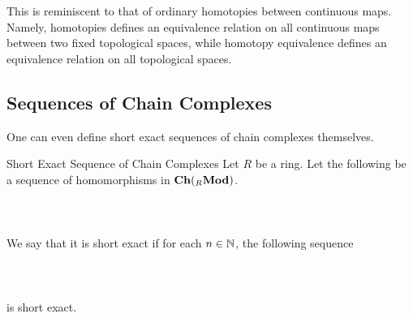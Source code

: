 \documentclass[a4paper]{article}
\begin{document}
This is reminiscent to that of ordinary homotopies between continuous maps. Namely, homotopies defines an equivalence relation on all continuous maps between two fixed topological spaces, while homotopy equivalence defines an equivalence relation on all topological spaces. 

\subsection{Sequences of Chain Complexes}
One can even define short exact sequences of chain complexes themselves. 

\begin{defn}{Short Exact Sequence of Chain Complexes}{} Let $R$ be a ring. Let the following be a sequence of homomorphisms in $\bold{Ch}({_R\bold{Mod}})$. \\~\\
\\~\\
We say that it is short exact if for each $n\in\mathbb{N}$, the following sequence\\~\\
\\~\\
is short exact. 
\end{defn}
\end{document}
